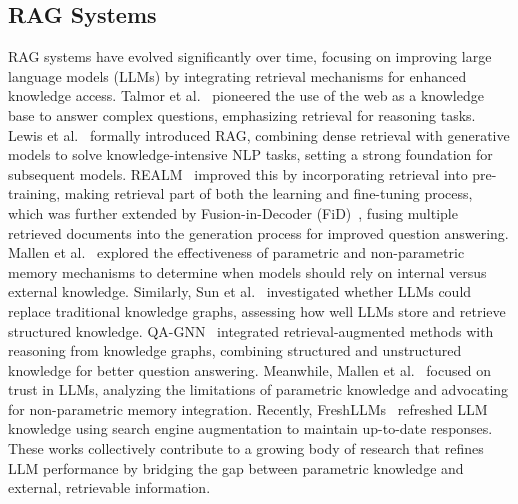 \subsection{RAG Systems}
RAG systems have evolved significantly over time, focusing on improving large language models (LLMs) by integrating retrieval mechanisms for enhanced knowledge access. Talmor et al.~\cite{talmor2018web} pioneered the use of the web as a knowledge base to answer complex questions, emphasizing retrieval for reasoning tasks. Lewis et al.~\cite{lewis2020retrieval} formally introduced RAG, combining dense retrieval with generative models to solve knowledge-intensive NLP tasks, setting a strong foundation for subsequent models. REALM~\cite{guu2020retrieval} improved this by incorporating retrieval into pre-training, making retrieval part of both the learning and fine-tuning process, which was further extended by Fusion-in-Decoder (FiD)~\cite{izacard2020leveraging}, fusing multiple retrieved documents into the generation process for improved question answering. Mallen et al.~\cite{mallen2022not} explored the effectiveness of parametric and non-parametric memory mechanisms to determine when models should rely on internal versus external knowledge. Similarly, Sun et al.~\cite{sun2023head} investigated whether LLMs could replace traditional knowledge graphs, assessing how well LLMs store and retrieve structured knowledge. QA-GNN~\cite{yasunaga2021qa} integrated retrieval-augmented methods with reasoning from knowledge graphs, combining structured and unstructured knowledge for better question answering. Meanwhile, Mallen et al.~\cite{mallen2022not} focused on trust in LLMs, analyzing the limitations of parametric knowledge and advocating for non-parametric memory integration. Recently, FreshLLMs~\cite{vu2023freshllms} refreshed LLM knowledge using search engine augmentation to maintain up-to-date responses. These works collectively contribute to a growing body of research that refines LLM performance by bridging the gap between parametric knowledge and external, retrievable information.

